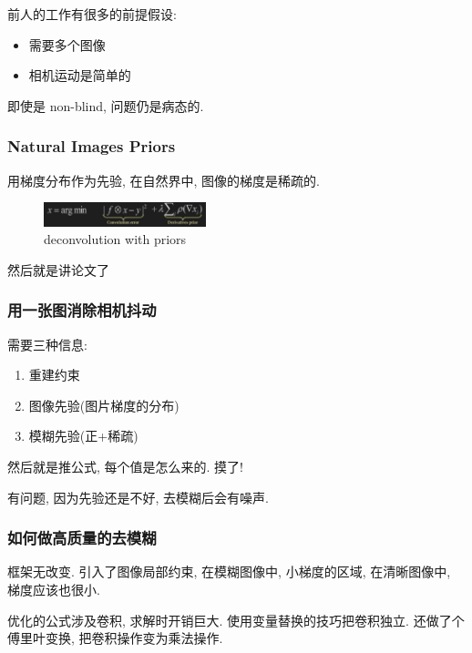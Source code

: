 前人的工作有很多的前提假设:
\begin{itemize}
    \item 需要多个图像
    \item 相机运动是简单的
\end{itemize}

即使是 non-blind, 问题仍是病态的. 

\subsubsection{Natural Images Priors}
用梯度分布作为先验, 在自然界中, 图像的梯度是稀疏的. 

\begin{figure}[!htb]
    \centering
    \includegraphics[width=0.42\textwidth]{pic/ACG9/deconvolution with priors}
    \caption{deconvolution with priors}
\end{figure}

然后就是讲论文了
\subsubsection{用一张图消除相机抖动}
需要三种信息:
\begin{enumerate}
    \item 重建约束
    \item 图像先验(图片梯度的分布)
    \item 模糊先验(正+稀疏)
\end{enumerate}

然后就是推公式, 每个值是怎么来的. 摸了!

有问题, 因为先验还是不好, 去模糊后会有噪声. 

\subsubsection{如何做高质量的去模糊}
框架无改变. 引入了图像局部约束, 在模糊图像中, 小梯度的区域, 在清晰图像中, 梯度应该也很小. 

优化的公式涉及卷积, 求解时开销巨大. 使用变量替换的技巧把卷积独立. 还做了个傅里叶变换, 把卷积操作变为乘法操作. 